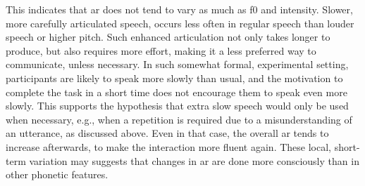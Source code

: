 This indicates that \ac{ar} does not tend to vary as much as \ac{f0} and intensity.
Slower, more carefully articulated speech, occurs less often in regular speech than louder speech or higher pitch.
Such enhanced articulation not only takes longer to produce, but also requires more effort, making it a less preferred way to communicate, unless necessary.
In such somewhat formal, experimental setting, participants are likely to speak more slowly than usual, and the motivation to complete the task in a short time does not encourage them to speak even more slowly.
This supports the hypothesis that extra slow speech would only be used when necessary, e.g., when a repetition is required due to a misunderstanding of an utterance, as discussed above.
Even in that case, the overall \ac{ar} tends to increase afterwards, to make the interaction more fluent again.
These local, short-term variation may suggests that changes in \ac{ar} are done more consciously than in other phonetic features.

